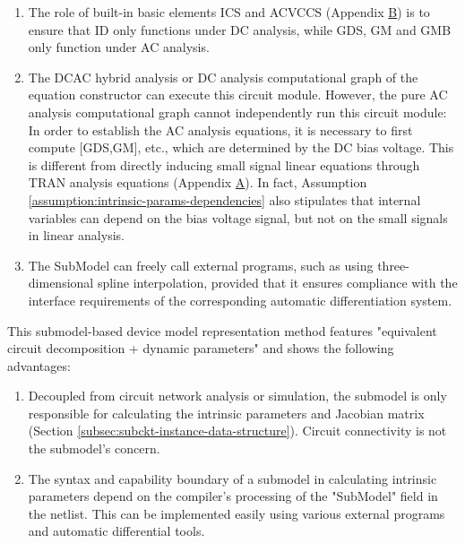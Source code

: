 \begin{enumerate}[partopsep=0pt,topsep=0pt,itemsep=0pt,parsep=0pt]
  \item The role of built-in basic elements ICS and ACVCCS (Appendix \hyperref[appendix:mos-subckt]{B}) is to ensure that ID only functions under DC analysis, while GDS, GM and GMB only function under AC analysis.
  \item The DCAC hybrid analysis or DC analysis computational graph of the equation constructor can execute this circuit module. However, the pure AC analysis computational graph cannot independently run this circuit module: In order to establish the AC analysis equations, it is necessary to first compute [GDS,GM], etc., which are determined by the DC bias voltage. This is different from directly inducing small signal linear equations through TRAN analysis equations (Appendix \hyperref[appendix:TRAN-to-AC-equation]{A}). In fact, Assumption \ref{assumption:intrinsic-params-dependencies} also stipulates that internal variables can depend on the bias voltage signal, but not on the small signals in linear analysis.
  \item The SubModel can freely call external programs, such as using three-dimensional spline interpolation, provided that it ensures compliance with the interface requirements of the corresponding automatic differentiation system.
\end{enumerate}
This submodel-based device model representation method features "equivalent circuit decomposition + dynamic parameters" and shows the following advantages:

\begin{enumerate}[partopsep=0pt,topsep=0pt,itemsep=0pt,parsep=0pt]
  \item Decoupled from circuit network analysis or simulation, the submodel is only responsible for calculating the intrinsic parameters and Jacobian matrix (Section \ref{subsec:subckt-instance-data-structure}). Circuit connectivity is not the submodel's concern.
  \item The syntax and capability boundary of a submodel in calculating intrinsic parameters depend on the compiler's processing of the "SubModel" field in the netlist. This can be implemented easily using various external programs and automatic differential tools.
\end{enumerate}

